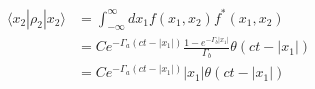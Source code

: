 \documentclass[aps,showpacs,groupedaddress]{revtex4}
\begin{document}
\begin{equation}
\label{eq1}
\begin{split}
\langle x{}_{2}|\rho_{2}|x_{2}\rangle&=\int_{-\infty}^{\infty}dx_{1}f(x_{1},x_{2})f^{*}(x_{1},x_{2})\\
&=C e^{-\Gamma_{a}(ct-|x_{1}|)}\frac{1-e^{-\Gamma_{b}|x_{1}|}}{\Gamma_{b}}\theta(ct-|x_{1}|)\\
&=Ce^{-\Gamma_{a}(ct-|x_{1}|)}|x_{1}|\theta(ct-|x_{1}|)
\end{split}
\end{equation}
\end{document}
